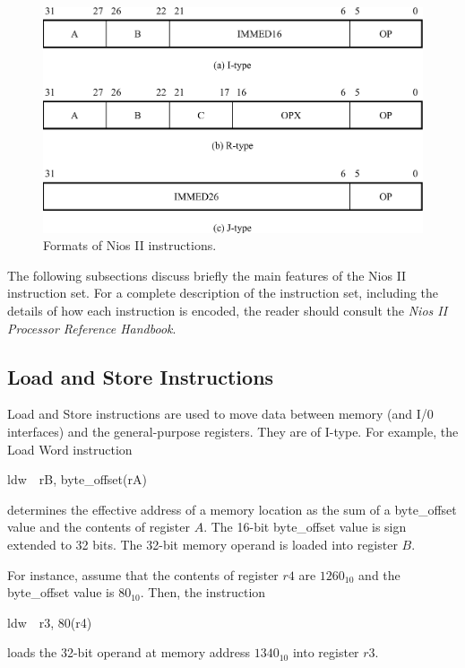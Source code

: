 \documentclass[11pt, twoside, pdftex]{article}
\begin{document}
\begin{figure}[H]
   \begin{center}
      \includegraphics[scale=1]{figures/figure5.png}
   \caption{Formats of Nios II instructions.} 
	 \label{fig:5}
	 \end{center}
\end{figure}

The following subsections discuss briefly the main features of the Nios II instruction set.
For a complete description of the instruction set, including the details of how each
instruction is encoded, the reader should consult the {\it Nios II Processor Reference Handbook}.

\subsection{Load and Store Instructions}

Load and Store instructions are used to move data between memory (and I/0 interfaces)
and the general-purpose registers. They are of I-type. For example, the Load Word instruction
\begin{center}
{\sf ldw~~rB, byte\_offset(rA)}
\end{center}
\noindent
determines the effective address of a memory location as the sum of a byte\_offset value and 
the contents of register $A$. The 16-bit byte\_offset value is sign extended to 32 bits.
The 32-bit memory operand is loaded into register $B$.

For instance, assume that the contents of register $r4$ are $1260_{10}$ and the byte\_offset value is 
$80_{10}$. Then, the instruction
\begin{center}
{\sf ldw~~r3, 80(r4)}
\end{center}
\noindent
loads the 32-bit operand at memory address $1340_{10}$ into register $r3$. 
 
\end{document}
